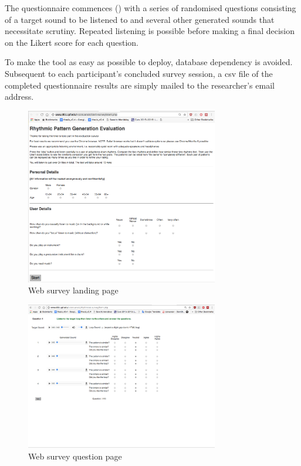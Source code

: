The questionnaire commences () with a series of randomised questions consisting of a target sound to be listened to and several other generated sounds that necessitate scrutiny. Repeated listening is possible before making a final decision on the Likert score for each question.

To make the tool as easy as possible to deploy, database dependency is avoided. Subsequent to each participant's concluded survey session, a \acrfull{csv} file of the completed questionnaire results are simply mailed to the researcher's email address.

\begin{figure}
	\begin{center}
		\includegraphics[width=0.75\textwidth]{ch99/figures/survey_landing.png}
	\end{center}
	\caption[Web survey landing page]{Web survey landing page}
	\label{fig:survey_landing}
\end{figure}

\begin{figure}
	\begin{center}
		\includegraphics[width=0.75\textwidth]{ch99/figures/survey_page.png}
	\end{center}
	\caption[Web survey question page]{Web survey question page}
	\label{fig:survey_page}
\end{figure}



